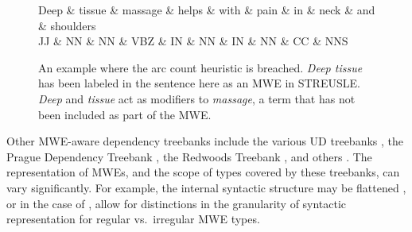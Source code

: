 \documentclass[output=paper
,modfonts
,nonflat]{langsci/langscibook}
\newcommand{\lex}[1]{\textit{#1}\xspace}
\begin{document}

\begin{figure*}[t]
\begin{center}
\begin{adjustbox}{width=.8\textwidth}
    \begin{dependency}[edge style={black!60!black,thick},
        label style={thick}, scale=1.2]
        \centering
        \begin{deptext}[column sep=.7cm, row sep=.1ex]
          \color{red}Deep \& \color{red}tissue \& massage \& helps \& with \& pain \& in \& neck \& and \& shoulders \\
          \footnotesize{JJ} \& \footnotesize{NN} \& \footnotesize{NN} \& \footnotesize{VBZ} \& \footnotesize{IN} \& \footnotesize{NN} \& \footnotesize{IN} \& \footnotesize{NN} \& \footnotesize{CC} \& \footnotesize{NNS} \\
        \end{deptext}
    \end{dependency}
\end{adjustbox}
\end{center}
\caption{An example where the arc count heuristic is breached. \lex{Deep tissue} has been labeled in the sentence here as an MWE in STREUSLE. \lex{Deep} and \lex{tissue} act as modifiers to \lex{massage}, a term that has not been included as part of the MWE.}
\label{fig:arc-ex}
\end{figure*}


Other MWE-aware dependency treebanks include the various UD treebanks \citep{nivre2016universal}, the Prague Dependency Treebank \citep{bejvcek2013prague}, the Redwoods Treebank \citep{Oepen+:2002}, and others \citep{Nivre04,Eryigit:2011:MES:2206359.2206365,Candito14}. The representation of MWEs, and the scope of types covered by these treebanks, can vary significantly. For example, the internal syntactic structure may be flattened \citep{Nivre04}, or in the case of \citet{Candito14}, allow for distinctions in the granularity of syntactic representation for regular vs.\ irregular MWE types. 
\end{document}

